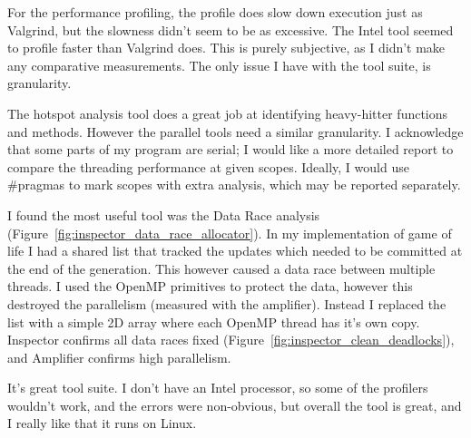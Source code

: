 \documentclass[10pt]{article}
\begin{document}
\begin{appendices}
For the performance profiling, the profile does slow down execution just as 
Valgrind, but the slowness didn't seem to be as excessive.  The Intel tool 
seemed to profile faster than Valgrind does.  This is purely subjective, as 
I didn't make any comparative measurements.  The only issue I have with the tool suite, is granularity.

The hotspot analysis tool does a great job at identifying heavy-hitter functions and methods. However the
parallel tools need a similar granularity. I acknowledge that some parts of my program are serial; I would 
like a more detailed report to compare the threading performance at given scopes. Ideally, I would
 use \#pragmas to mark scopes with extra analysis, which may be reported separately.

I found the most useful tool was the Data Race analysis (Figure~\ref{fig:inspector_data_race_allocator}).  In
my implementation of game of life I had a shared list that tracked the updates which needed to be committed 
at the end of the generation.  This however caused a data race between multiple threads. I used the OpenMP 
primitives to protect the data, however this destroyed the parallelism (measured with the amplifier). Instead 
I replaced the list with a simple 2D array where each OpenMP thread has it's own copy. Inspector confirms all data
races fixed (Figure~\ref{fig:inspector_clean_deadlocks}), and Amplifier confirms high parallelism.

It's great tool suite. I don't have an Intel processor, so some of the profilers 
wouldn't work, and the errors were non-obvious, but overall the tool is great, and 
I really like that it runs on Linux.

\end{appendices}

\end{document}
